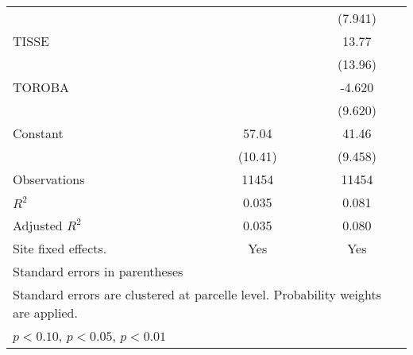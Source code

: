{\begin{tabular}{l*{2}{c}}
                    &                     &     (7.941)         \\
[1em]
TISSE               &                     &       13.77         \\
                    &                     &     (13.96)         \\
[1em]
TOROBA              &                     &      -4.620         \\
                    &                     &     (9.620)         \\
[1em]
Constant            &       57.04\sym{***}&       41.46\sym{***}\\
                    &     (10.41)         &     (9.458)         \\
\hline
Observations        &       11454         &       11454         \\
\(R^{2}\)           &       0.035         &       0.081         \\
Adjusted \(R^{2}\)  &       0.035         &       0.080         \\
Site fixed effects. &         Yes         &         Yes         \\
\hline\hline
\multicolumn{3}{l}{\footnotesize Standard errors in parentheses}\\
\multicolumn{3}{l}{\footnotesize Standard errors are clustered at parcelle level. Probability weights are applied.}\\
\multicolumn{3}{l}{\footnotesize \sym{*} \(p<0.10\), \sym{**} \(p<0.05\), \sym{***} \(p<0.01\)}\\
\end{tabular}
}
